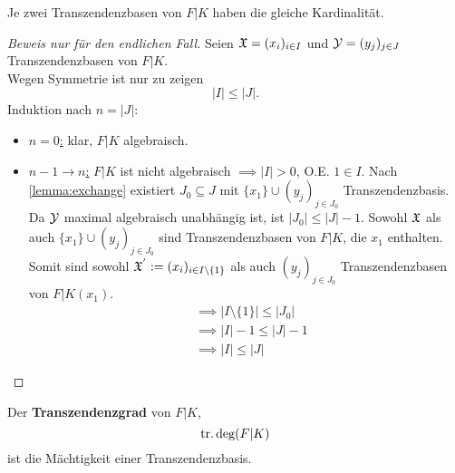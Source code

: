 \begin{satz}[Steinitz, 1910]
    Je zwei Transzendenzbasen von $F|K$ haben die gleiche Kardinalität.
\end{satz}

\begin{proof}[Beweis nur für den endlichen Fall]
    Seien $\mathfrak{X}=(x_i)_{i \in I}$ und $\mathcal{Y} = (y_j)_{j \in J}$ Transzendenzbasen von $F|K$.\\
    Wegen Symmetrie ist nur zu zeigen
    $$ |I| \leq |J|. $$
    Induktion nach $n = |J|$:
    \begin{itemize}[label=]
        \item \underline{$n=0$:} klar, $F|K$ algebraisch.
        \item  \underline{$n-1 \to n$:} $F|K$ ist nicht algebraisch 
        $\implies |I| > 0$, O.E. $1 \in I$. Nach \cref{lemma:exchange} existiert $J_0 \subseteq J$ mit
        $\{x_1\} \cup (y_j)_{j\in J_0}$ Transzendenzbasis. 
        Da $\mathcal{Y}$ maximal algebraisch unabhängig ist, ist $|J_0| \leq |J| -1$.
        Sowohl $\mathfrak{X}$ als auch $\{x_1\} \cup (y_j)_{j \in J_0}$ sind Transzendenzbasen von $F|K$, die $x_1$ enthalten.
        Somit sind sowohl $\mathfrak{X}^{'}:= (x_i)_{i \in I\setminus \{1\}}$ als auch $(y_j)_{j \in J_0}$ Transzendenzbasen von $F|K(x_1)$.
        \begin{align*}
            &\implies |I \setminus\{1\}| \leq |J_0| \\
            &\implies |I| -1 \leq |J| -1 \\
            &\implies |I| \leq |J|            
        \end{align*}
    \end{itemize}
\end{proof}

\begin{definition}
    Der \textbf{Transzendenzgrad} von $F|K$, 
    $$ \operatorname{tr.deg}(F|K) $$ ist die Mächtigkeit einer Transzendenzbasis.
\end{definition}

